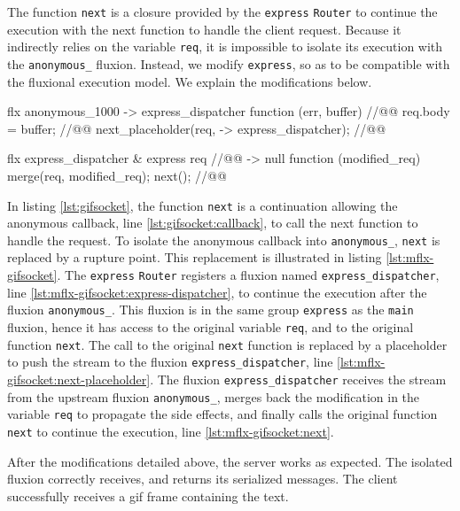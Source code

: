 The function \texttt{next} is a closure provided by the \texttt{express} \texttt{Router} to continue the execution with the next function to handle the client request.
Because it indirectly relies on the variable \texttt{req}, it is impossible to isolate its execution with the \texttt{anony\-mous\_} fluxion.
Instead, we modify \texttt{express}, so as to be compatible with the fluxional execution model.
We explain the modifications below.

\begin{code}[flx, caption={Simplified modification on the compiled result},label={lst:mflx-gifsocket}]
flx anonymous_1000
-> express_dispatcher
  function (err, buffer) { //@\label{lst:mflx-gifsocket:callback}@
    req.body = buffer; //@\label{lst:mflx-gifsocket:buffer}@
    next_placeholder(req, -> express_dispatcher); //@\label{lst:mflx-gifsocket:next-placeholder}@
  }

flx express_dispatcher & express {req} //@\label{lst:mflx-gifsocket:express-dispatcher}@
-> null
  function (modified_req) {
    merge(req, modified_req);
    next(); //@\label{lst:mflx-gifsocket:next}@
  }
\end{code}

In listing \ref{lst:gifsocket}, the function \texttt{next} is a continuation allowing the anonymous callback, line \ref{lst:gifsocket:callback}, to call the next function to handle the request.
To isolate the anonymous callback into \texttt{anonymous\_}, \texttt{next} is replaced by a rupture point.
This replacement is illustrated in listing \ref{lst:mflx-gifsocket}.
The \texttt{express} \texttt{Router} registers a fluxion named \texttt{express\_\-dispatcher}, line \ref{lst:mflx-gifsocket:express-dispatcher}, to continue the execution after the fluxion \texttt{anony\-mous\_}.
This fluxion is in the same group \texttt{express} as the \texttt{main} fluxion, hence it has access to the original variable \texttt{req}, and to the original function \texttt{next}.
The call to the original \texttt{next} function is replaced by a placeholder to push the stream to the fluxion \texttt{express\_\-dispatcher}, line \ref{lst:mflx-gifsocket:next-placeholder}.
The fluxion \texttt{express\_\-dispatcher} receives the stream from the upstream fluxion \texttt{anony\-mous\_}, merges back the modification in the variable \texttt{req} to propagate the side effects, and finally calls the original function \texttt{next} to continue the execution, line \ref{lst:mflx-gifsocket:next}.

After the modifications detailed above, the server works as expected.
The isolated fluxion correctly receives, and returns its serialized messages.
The client successfully receives a gif frame containing the text.



